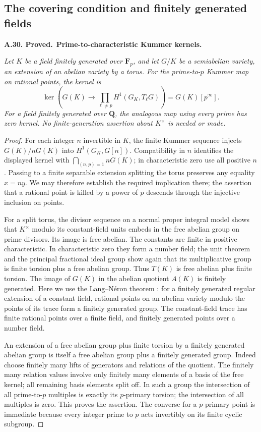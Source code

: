 \documentclass[11pt,a4paper]{article}
\newenvironment{claim}[3]{\par\medskip\noindent\hypertarget{#1}{\textbf{#1. #2.}}\ \textbf{#3.}\par\nopagebreak\smallskip\begingroup\itshape}{\endgroup\par\smallskip}
\begin{document}
\subsection{The covering condition and finitely generated fields}

\begin{claim}{A.30}{Proved}{Prime-to-characteristic Kummer kernels}
Let $K$ be a field finitely generated over $\mathbf F_p$, and let $G/K$
be a semiabelian variety, an extension of an abelian variety by a torus.
For the prime-to-$p$ Kummer map on rational points, the kernel is
\[
 \ker\left(G(K)\longrightarrow
       \prod_{\ell\ne p}H^1(G_K,T_\ell G)\right)=G(K)[p^\infty].
\]
For a field finitely generated over $\mathbf Q$, the analogous map
using every prime has zero kernel. No finite-generation assertion
about $K^\times$ is needed or made.
\end{claim}
\begin{proof}
For each integer $n$ invertible in $K$, the finite Kummer sequence
injects $G(K)/nG(K)$ into $H^1(G_K,G[n])$. Compatibility in $n$
identifies the displayed kernel with
$\bigcap_{(n,p)=1}nG(K)$; in characteristic zero use all positive $n$.
Passing to a finite separable extension splitting the torus preserves
any equality $x=ny$. We may therefore establish the required
implication there; the assertion that a rational point is killed by
a power of $p$ descends through the injective inclusion on points.

For a split torus, the divisor sequence on a normal proper integral
model shows that $K^\times$ modulo its constant-field units embeds in
the free abelian group on prime divisors. Its image is free abelian.
The constants are finite in positive characteristic. In characteristic
zero they form a number field; the unit theorem and the principal
fractional ideal group show again that its multiplicative group is
finite torsion plus a free abelian group. Thus $T(K)$ is free abelian
plus finite torsion. The image of $G(K)$ in the abelian quotient $A(K)$
is finitely generated. Here we use the Lang--N\'eron theorem
\cite[Theorem 2.1]{Conrad2006}: for a finitely generated regular
extension of a constant field, rational points on an abelian variety
modulo the points of its trace form a finitely generated group. The
constant-field trace has finite rational points over a finite field,
and finitely generated points over a number field.

An extension of a free abelian group plus finite torsion by a finitely
generated abelian group is itself a free abelian group plus a finitely
generated group. Indeed choose finitely many lifts of generators and
relations of the quotient. The finitely many relation values involve
only finitely many elements of a basis of the free kernel; all remaining
basis elements split off. In such a group the intersection of all
prime-to-$p$ multiples is exactly its $p$-primary torsion; the
intersection of all multiples is zero. This proves the assertion.
The converse for a $p$-primary point is immediate because every integer
prime to $p$ acts invertibly on its finite cyclic subgroup.
\end{proof}
\end{document}
